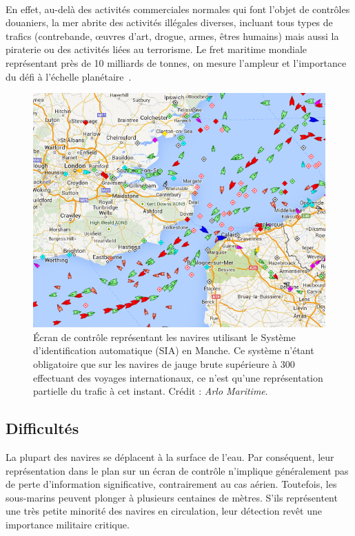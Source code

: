 	\paragraph{}
	En effet, au-delà des activités commerciales normales qui font l'objet de contrôles douaniers, la mer abrite des activités illégales diverses, incluant tous types de trafics (contrebande, œuvres d'art, drogue, armes, êtres humains) mais aussi la piraterie ou des activités liées au terrorisme.
	Le fret maritime mondiale représentant près de 10 milliards de tonnes, on mesure l'ampleur et l'importance du défi à l'échelle planétaire~\cite{unctad}.
	
	
	\begin{figure}[H]
		\centering
		\includegraphics[width=\textwidth]{figures/channel}
		\caption{Écran de contrôle représentant les navires utilisant le Système d'identification automatique (SIA) en Manche. Ce système n'étant obligatoire que sur les navires de jauge brute supérieure à 300 effectuant des voyages internationaux, ce n'est qu'une représentation partielle du trafic à cet instant. Crédit : \emph{Arlo Maritime}.}
		\label{fig:channel}
	\end{figure}
	
	\subsection{Difficultés}
	La plupart des navires se déplacent à la surface de l'eau. Par conséquent, leur représentation dans le plan sur un écran de contrôle n'implique généralement pas de perte d'information significative, contrairement au cas aérien. Toutefois, les sous-marins peuvent plonger à plusieurs centaines de mètres. S'ils représentent une très petite minorité des navires en circulation, leur détection revêt une importance militaire critique.
	
